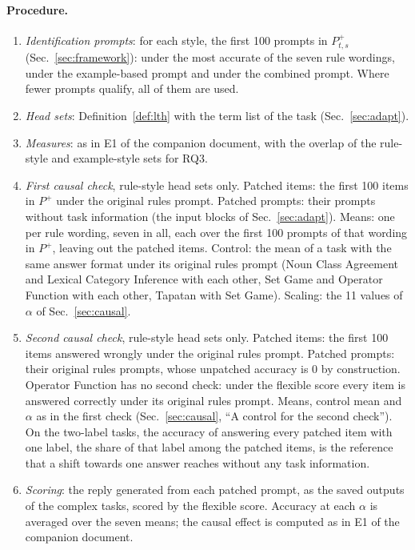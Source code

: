 \documentclass[11pt,a4paper]{article}
\begin{document}
\paragraph{Procedure.}
\begin{enumerate}
\item \emph{Identification prompts}: for each style, the first 100 prompts in $P^{+}_{t,s}$ (Sec.~\ref{sec:framework}): under the most accurate of the seven rule wordings, under the example-based prompt and under the combined prompt. Where fewer prompts qualify, all of them are used.
\item \emph{Head sets}: Definition~\ref{def:lth} with the term list of the task (Sec.~\ref{sec:adapt}).
\item \emph{Measures}: as in E1 of the companion document, with the overlap of the rule-style and example-style sets for RQ3.
\item \emph{First causal check}, rule-style head sets only. Patched items: the first 100 items in $P^{+}$ under the original rules prompt. Patched prompts: their prompts without task information (the input blocks of Sec.~\ref{sec:adapt}). Means: one per rule wording, seven in all, each over the first 100 prompts of that wording in $P^{+}$, leaving out the patched items. Control: the mean of a task with the same answer format under its original rules prompt (Noun Class Agreement and Lexical Category Inference with each other, Set Game and Operator Function with each other, Tapatan with Set Game). Scaling: the 11 values of $\alpha$ of Sec.~\ref{sec:causal}.
\item \emph{Second causal check}, rule-style head sets only. Patched items: the first 100 items answered wrongly under the original rules prompt. Patched prompts: their original rules prompts, whose unpatched accuracy is 0 by construction. Operator Function has no second check: under the flexible score every item is answered correctly under its original rules prompt. Means, control mean and $\alpha$ as in the first check (Sec.~\ref{sec:causal}, ``A control for the second check''). On the two-label tasks, the accuracy of answering every patched item with one label, the share of that label among the patched items, is the reference that a shift towards one answer reaches without any task information.
\item \emph{Scoring}: the reply generated from each patched prompt, as the saved outputs of the complex tasks, scored by the flexible score. Accuracy at each $\alpha$ is averaged over the seven means; the causal effect is computed as in E1 of the companion document.
\end{enumerate}
\end{document}
